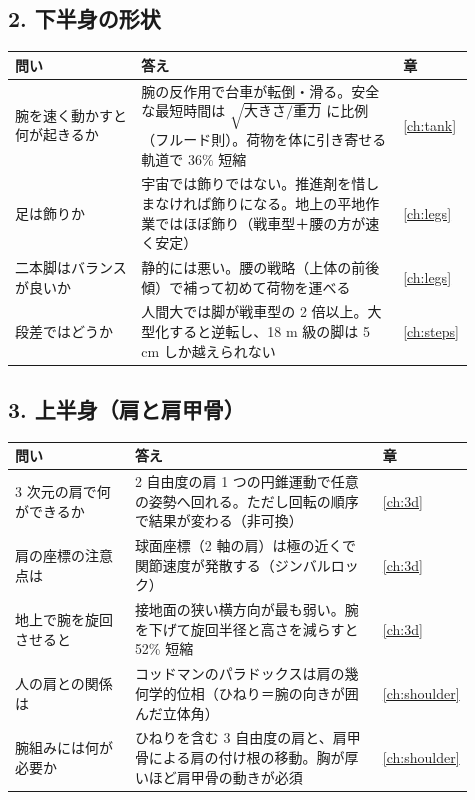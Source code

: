 \subsection{2. 下半身の形状}

\begin{longtable}{p{0.27\linewidth}p{0.56\linewidth}p{0.08\linewidth}}
\toprule
問い & 答え & 章 \\ \midrule \endhead
腕を速く動かすと何が起きるか & 腕の反作用で台車が転倒・滑る。安全な最短時間は $\sqrt{\text{大きさ}/\text{重力}}$ に比例（フルード則）。荷物を体に引き寄せる軌道で 36\% 短縮 & \ref{ch:tank} \\
足は飾りか & 宇宙では飾りではない。推進剤を惜しまなければ飾りになる。地上の平地作業ではほぼ飾り（戦車型＋腰の方が速く安定） & \ref{ch:legs} \\
二本脚はバランスが良いか & 静的には悪い。腰の戦略（上体の前後傾）で補って初めて荷物を運べる & \ref{ch:legs} \\
段差ではどうか & 人間大では脚が戦車型の 2 倍以上。大型化すると逆転し、18 m 級の脚は 5 cm しか越えられない & \ref{ch:steps} \\
\bottomrule
\end{longtable}

\subsection{3. 上半身（肩と肩甲骨）}

\begin{longtable}{p{0.27\linewidth}p{0.56\linewidth}p{0.08\linewidth}}
\toprule
問い & 答え & 章 \\ \midrule \endhead
3 次元の肩で何ができるか & 2 自由度の肩 1 つの円錐運動で任意の姿勢へ回れる。ただし回転の順序で結果が変わる（非可換） & \ref{ch:3d} \\
肩の座標の注意点は & 球面座標（2 軸の肩）は極の近くで関節速度が発散する（ジンバルロック） & \ref{ch:3d} \\
地上で腕を旋回させると & 接地面の狭い横方向が最も弱い。腕を下げて旋回半径と高さを減らすと 52\% 短縮 & \ref{ch:3d} \\
人の肩との関係は & コッドマンのパラドックスは肩の幾何学的位相（ひねり＝腕の向きが囲んだ立体角） & \ref{ch:shoulder} \\
腕組みには何が必要か & ひねりを含む 3 自由度の肩と、肩甲骨による肩の付け根の移動。胸が厚いほど肩甲骨の動きが必須 & \ref{ch:shoulder} \\
\bottomrule
\end{longtable}

